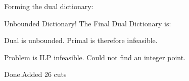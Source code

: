 \documentclass[8pt]{article}
\begin{document}
Forming the dual dictionary:

Unbounded Dictionary!
The Final Dual Dictionary is: 

 Dual is unbounded. Primal is therefore infeasible. 

Problem is ILP infeasible. Could not find an integer point. 

Done.Added 26 cuts 
\end{document}
